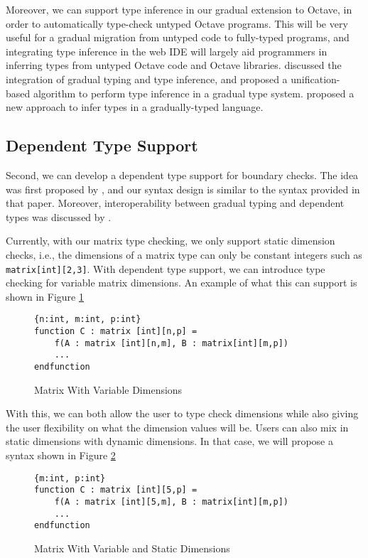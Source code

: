 Moreover, we can support type inference in our gradual extension to Octave, in order to automatically type-check untyped Octave programs. This will be very useful for a gradual migration from untyped code to fully-typed programs, and integrating type inference in the web IDE will largely aid programmers in inferring types from untyped Octave code and Octave libraries. \citet{siek2008gradual} discussed the integration of gradual typing and type inference, and proposed a unification-based algorithm to perform type inference in a gradual type system. \citet{garcia2015principal} proposed a new approach to infer types in a gradually-typed language. 

\subsection{Dependent Type Support}
Second, we can develop a dependent type support for boundary checks. The idea was first proposed by \citet{xi1998eliminating}, and our syntax design is similar to the syntax provided in that paper. Moreover, interoperability between gradual typing and dependent types was discussed by \citet{lehmann2017gradual}.

Currently, with our matrix type checking, we only support static dimension checks, i.e., the dimensions of a matrix type can only be constant integers such as {\tt matrix[int][2,3]}. With dependent type support, we can introduce type checking for variable matrix dimensions. An example of what this can support is shown in Figure \ref{fig:variableDimensions}

\begin{figure}[h]
    \begin{lstlisting}[language=racket]
{n:int, m:int, p:int}
function C : matrix [int][n,p] = 
    f(A : matrix [int][n,m], B : matrix[int][m,p])
	...
endfunction
    \end{lstlisting}
    \caption[]{{Matrix With Variable Dimensions}}
    \label{fig:variableDimensions}
\end{figure}

With this, we can both allow the user to type check dimensions while also giving the user flexibility on what the dimension values will be. Users can also mix in static dimensions with dynamic dimensions. In that case, we will propose a syntax shown in Figure \ref{fig:variableAndStaticDimensions}

\begin{figure}[h]
    \begin{lstlisting}[language=racket]
{m:int, p:int}
function C : matrix [int][5,p] = 
    f(A : matrix [int][5,m], B : matrix[int][m,p])
	...
endfunction
    \end{lstlisting}
    \caption[]{{Matrix With Variable and Static Dimensions}}
    \label{fig:variableAndStaticDimensions}
\end{figure}

